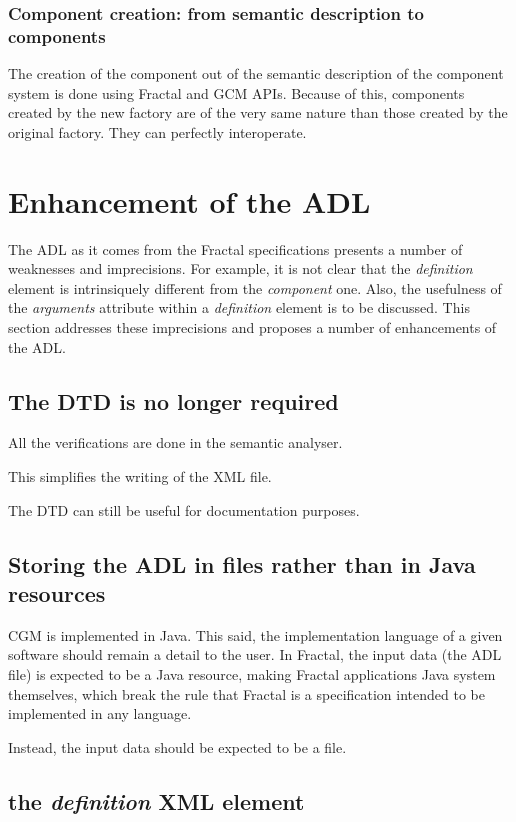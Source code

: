 \documentclass{article}
\newcommand{\xml}[1]{\textsl{#1}}
\begin{document}
\subsubsection{Component creation: from semantic description to components}

The creation of the component out of the semantic description of the component system is done
using Fractal and GCM APIs. Because of this, components created by the new factory are of the very same
nature than those created by the original factory. They can perfectly interoperate.


\section{Enhancement of the ADL}

The ADL as it comes from the Fractal specifications presents a number of weaknesses and imprecisions.
For example, it is not clear that the \xml{definition} element is intrinsiquely different from the \xml{component} one.
Also, the usefulness of the \xml{arguments} attribute within a \xml{definition} element is to be discussed.
This section addresses these imprecisions and proposes a number of enhancements of the ADL.


\subsection{The DTD is no longer required}

All the verifications are done in the semantic analyser.

This simplifies the writing of the XML file.

The DTD can still be useful for documentation purposes.


\subsection{Storing the ADL in files rather than in Java resources}

CGM is implemented in Java. This said, the implementation language of a given software
should remain a detail to the user. In Fractal, the input data (the ADL file) is expected
to be a Java resource, making Fractal applications Java system themselves, which break the rule
that Fractal is a specification intended to be implemented in any language.

Instead, the input data should be expected to be a file.


\subsection{the \xml{definition} XML element}
\end{document}
